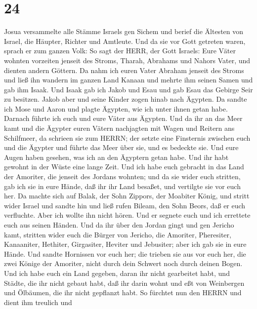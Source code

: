 \hypertarget{section-23}{%
\section{24}\label{section-23}}

 Josua versammelte alle Stämme Israels gen Sichem und berief
die Ältesten von Israel, die Häupter, Richter und Amtleute. Und da sie
vor Gott getreten waren,  sprach er zum ganzen Volk: So sagt
der HERR, der Gott Israels: Eure Väter wohnten vorzeiten jenseit des
Stroms, Tharah, Abrahams und Nahors Vater, und dienten andern Göttern.
 Da nahm ich euren Vater Abraham jenseit des Stroms und ließ
ihn wandern im ganzen Land Kanaan und mehrte ihm seinen Samen und gab
ihm Isaak.  Und Isaak gab ich Jakob und Esau und gab Esau
das Gebirge Seir zu besitzen. Jakob aber und seine Kinder zogen hinab
nach Ägypten.  Da sandte ich Mose und Aaron und plagte
Ägypten, wie ich unter ihnen getan habe.  Darnach führte ich
euch und eure Väter aus Ägypten. Und da ihr an das Meer kamt und die
Ägypter euren Vätern nachjagten mit Wagen und Reitern ans Schilfmeer,
 da schrieen sie zum HERRN; der setzte eine Finsternis
zwischen euch und die Ägypter und führte das Meer über sie, und es
bedeckte sie. Und eure Augen haben gesehen, was ich an den Ägyptern
getan habe. Und ihr habt gewohnt in der Wüste eine lange Zeit.
 Und ich habe euch gebracht in das Land der Amoriter, die
jenseit des Jordans wohnten; und da sie wider euch stritten, gab ich sie
in eure Hände, daß ihr ihr Land besaßet, und vertilgte sie vor euch her.
 Da machte sich auf Balak, der Sohn Zippors, der Moabiter
König, und stritt wider Israel und sandte hin und ließ rufen Bileam, den
Sohn Beors, daß er euch verfluchte.  Aber ich wollte ihn
nicht hören. Und er segnete euch und ich errettete euch aus seinen
Händen.  Und da ihr über den Jordan gingt und gen Jericho
kamt, stritten wider euch die Bürger von Jericho, die Amoriter,
Pheresiter, Kanaaniter, Hethiter, Girgasiter, Heviter und Jebusiter;
aber ich gab sie in eure Hände.  Und sandte Hornissen vor
euch her; die trieben sie aus vor euch her, die zwei Könige der
Amoriter, nicht durch dein Schwert noch durch deinen Bogen.
 Und ich habe euch ein Land gegeben, daran ihr nicht
gearbeitet habt, und Städte, die ihr nicht gebaut habt, daß ihr darin
wohnt und eßt von Weinbergen und Ölbäumen, die ihr nicht gepflanzt habt.
 So fürchtet nun den HERRN und dient ihm treulich und

